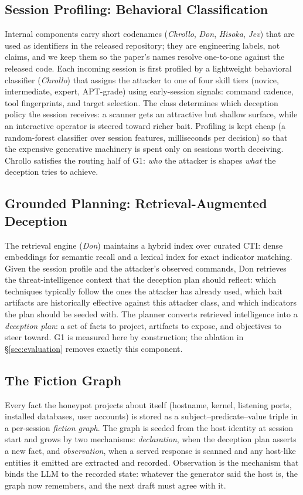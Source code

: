 \subsection{Session Profiling: Behavioral Classification}
\label{sec:chrollo}
Internal components carry short codenames (\emph{Chrollo}, \emph{Don},
\emph{Hisoka}, \emph{Jev}) that are used as identifiers in the released
repository; they are engineering labels, not claims, and we keep them so
the paper's names resolve one-to-one against the released code. Each
incoming session is first profiled by a lightweight behavioral
classifier (\emph{Chrollo}) that assigns the attacker to one of four
skill tiers (novice, intermediate, expert, APT-grade) using early-session
signals: command cadence, tool fingerprints, and target selection. The class determines which
deception policy the session receives: a scanner gets an attractive but
shallow surface, while an interactive operator is steered toward richer
bait. Profiling is kept cheap (a random-forest classifier over session
features, milliseconds per decision) so that the expensive
generative machinery is spent only on sessions worth deceiving. Chrollo
satisfies the routing half of G1: \emph{who} the attacker is shapes
\emph{what} the deception tries to achieve.

\subsection{Grounded Planning: Retrieval-Augmented Deception}
\label{sec:don}
The retrieval engine (\emph{Don}) maintains a hybrid index over curated
CTI: dense embeddings for semantic recall and a lexical index for exact
indicator matching. Given the session profile and the attacker's observed
commands, Don retrieves the threat-intelligence context that the deception
plan should reflect: which techniques typically follow the ones the
attacker has already used, which bait artifacts are historically
effective
against this attacker class, and which indicators the plan should
be
seeded with. The planner converts retrieved intelligence into a
\emph{deception plan}: a set of facts to project, artifacts to expose, and
objectives to steer toward. G1 is measured here by construction; the
ablation in \S\ref{sec:evaluation} removes exactly this component.

\subsection{The Fiction Graph}
\label{sec:graph}
Every fact the honeypot projects about itself (hostname, kernel, listening
ports, installed databases, user accounts) is stored as a
subject--predicate--value triple in a per-session \emph{fiction graph}.
The graph is seeded from the host identity at session start and grows by
two mechanisms: \emph{declaration}, when the deception plan asserts a new
fact, and \emph{observation}, when a served response is scanned and any
host-like entities it emitted are extracted and recorded. Observation is
the mechanism that binds the LLM to the recorded state: whatever the generator said the
host is, the graph now remembers, and the next draft must agree with it.

